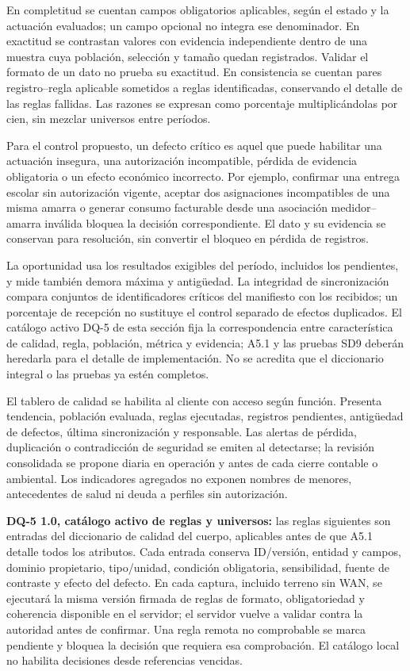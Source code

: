 En completitud se cuentan campos obligatorios aplicables, según el estado y la actuación evaluados; un campo opcional no integra ese denominador. En exactitud se contrastan valores con evidencia independiente dentro de una muestra cuya población, selección y tamaño quedan registrados. Validar el formato de un dato no prueba su exactitud. En consistencia se cuentan pares registro--regla aplicable sometidos a reglas identificadas, conservando el detalle de las reglas fallidas. Las razones se expresan como porcentaje multiplicándolas por cien, sin mezclar universos entre períodos.

Para el control propuesto, un defecto crítico es aquel que puede habilitar una actuación insegura, una autorización incompatible, pérdida de evidencia obligatoria o un efecto económico incorrecto. Por ejemplo, confirmar una entrega escolar sin autorización vigente, aceptar dos asignaciones incompatibles de una misma amarra o generar consumo facturable desde una asociación medidor--amarra inválida bloquea la decisión correspondiente. El dato y su evidencia se conservan para resolución, sin convertir el bloqueo en pérdida de registros.

La oportunidad usa los resultados exigibles del período, incluidos los pendientes, y mide también demora máxima y antigüedad. La integridad de sincronización compara conjuntos de identificadores críticos del manifiesto con los recibidos; un porcentaje de recepción no sustituye el control separado de efectos duplicados. El catálogo activo DQ-5 de esta sección fija la correspondencia entre característica de calidad, regla, población, métrica y evidencia; A5.1 y las pruebas SD9 deberán heredarla para el detalle de implementación. No se acredita que el diccionario integral o las pruebas ya estén completos.

El tablero de calidad se habilita al cliente con acceso según función. Presenta tendencia, población evaluada, reglas ejecutadas, registros pendientes, antigüedad de defectos, última sincronización y responsable. Las alertas de pérdida, duplicación o contradicción de seguridad se emiten al detectarse; la revisión consolidada se propone diaria en operación y antes de cada cierre contable o ambiental. Los indicadores agregados no exponen nombres de menores, antecedentes de salud ni deuda a perfiles sin autorización.


\textbf{DQ-5 1.0, catálogo activo de reglas y universos:}
\label{subsec:sd5_reglas_calidad}
las reglas siguientes son entradas del diccionario de calidad del cuerpo, aplicables antes de que A5.1 detalle todos los atributos. Cada entrada conserva ID/versión, entidad y campos, dominio propietario, tipo/unidad, condición obligatoria, sensibilidad, fuente de contraste y efecto del defecto. En cada captura, incluido terreno sin WAN, se ejecutará la misma versión firmada de reglas de formato, obligatoriedad y coherencia disponible en el servidor; el servidor vuelve a validar contra la autoridad antes de confirmar. Una regla remota no comprobable se marca pendiente y bloquea la decisión que requiera esa comprobación. El catálogo local no habilita decisiones desde referencias vencidas.

